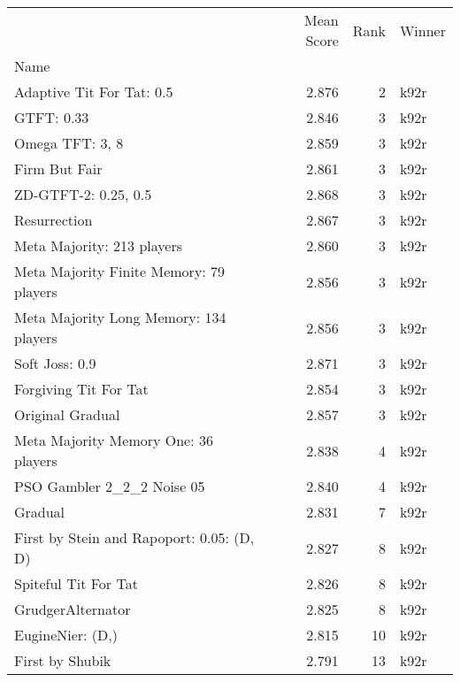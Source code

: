 \begin{tabular}{lrrl}
\toprule
 & Mean Score & Rank & Winner \\
Name &  &  &  \\
\midrule
Adaptive Tit For Tat: 0.5 & 2.876 & 2 & k92r \\
GTFT: 0.33 & 2.846 & 3 & k92r \\
Omega TFT: 3, 8 & 2.859 & 3 & k92r \\
Firm But Fair & 2.861 & 3 & k92r \\
ZD-GTFT-2: 0.25, 0.5 & 2.868 & 3 & k92r \\
Resurrection & 2.867 & 3 & k92r \\
Meta Majority: 213 players & 2.860 & 3 & k92r \\
Meta Majority Finite Memory: 79 players & 2.856 & 3 & k92r \\
Meta Majority Long Memory: 134 players & 2.856 & 3 & k92r \\
Soft Joss: 0.9 & 2.871 & 3 & k92r \\
Forgiving Tit For Tat & 2.854 & 3 & k92r \\
Original Gradual & 2.857 & 3 & k92r \\
Meta Majority Memory One: 36 players & 2.838 & 4 & k92r \\
PSO Gambler 2\_2\_2 Noise 05 & 2.840 & 4 & k92r \\
Gradual & 2.831 & 7 & k92r \\
First by Stein and Rapoport: 0.05: (D, D) & 2.827 & 8 & k92r \\
Spiteful Tit For Tat & 2.826 & 8 & k92r \\
GrudgerAlternator & 2.825 & 8 & k92r \\
EugineNier: (D,) & 2.815 & 10 & k92r \\
First by Shubik & 2.791 & 13 & k92r \\
\bottomrule
\end{tabular}
